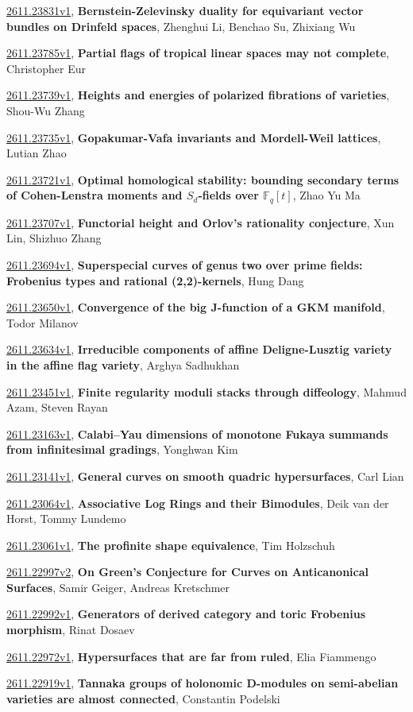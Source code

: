 \documentclass[9pt, a4paper]{article}
\theoremstyle{plain}
\theoremstyle{definition}
\theoremstyle{remark}
\newcommand{\arxiv}[3]{\href{https://arxiv.org/abs/#1}{#1}, \textbf{\textcolor{arxivblue}{#2}}, #3}
\begin{document}
\arxiv{2611.23831v1}{Bernstein-Zelevinsky duality for equivariant vector bundles on Drinfeld spaces}{Zhenghui Li, Benchao Su, Zhixiang Wu}

\arxiv{2611.23785v1}{Partial flags of tropical linear spaces may not complete}{Christopher Eur}

\arxiv{2611.23739v1}{Heights and energies of polarized fibrations of varieties}{Shou-Wu Zhang}

\arxiv{2611.23735v1}{Gopakumar-Vafa invariants and Mordell-Weil lattices}{Lutian Zhao}

\arxiv{2611.23721v1}{Optimal homological stability: bounding secondary terms of Cohen-Lenstra moments and $S_d$-fields over $\mathbb{F}_q[t]$}{Zhao Yu Ma}

\arxiv{2611.23707v1}{Functorial height and Orlov's rationality conjecture}{Xun Lin, Shizhuo Zhang}

\arxiv{2611.23694v1}{Superspecial curves of genus two over prime fields: Frobenius types and rational (2,2)-kernels}{Hung Dang}

\arxiv{2611.23650v1}{Convergence of the big J-function of a GKM manifold}{Todor Milanov}

\arxiv{2611.23634v1}{Irreducible components of affine Deligne-Lusztig variety in the affine flag variety}{Arghya Sadhukhan}

\arxiv{2611.23451v1}{Finite regularity moduli stacks through diffeology}{Mahmud Azam, Steven Rayan}

\arxiv{2611.23163v1}{Calabi--Yau dimensions of monotone Fukaya summands from infinitesimal gradings}{Yonghwan Kim}

\arxiv{2611.23141v1}{General curves on smooth quadric hypersurfaces}{Carl Lian}

\arxiv{2611.23064v1}{Associative Log Rings and their Bimodules}{Deik van der Horst, Tommy Lundemo}

\arxiv{2611.23061v1}{The profinite shape equivalence}{Tim Holzschuh}

\arxiv{2611.22997v2}{On Green's Conjecture for Curves on Anticanonical Surfaces}{Samir Geiger, Andreas Kretschmer}

\arxiv{2611.22992v1}{Generators of derived category and toric Frobenius morphism}{Rinat Dosaev}

\arxiv{2611.22972v1}{Hypersurfaces that are far from ruled}{Elia Fiammengo}

\arxiv{2611.22919v1}{Tannaka groups of holonomic D-modules on semi-abelian varieties are almost connected}{Constantin Podelski}
\end{document}
